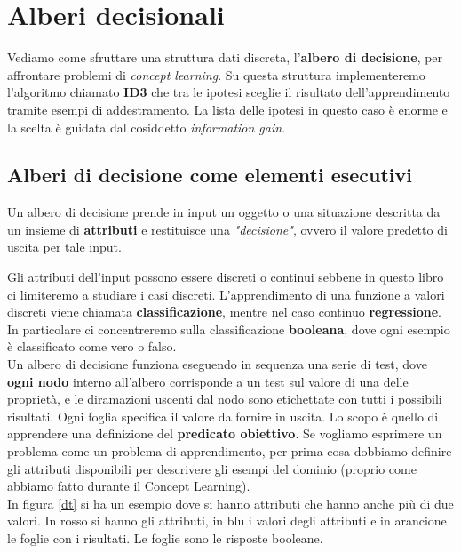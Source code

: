 \chapter{Alberi decisionali}
\label{Capitolo 3}
Vediamo come sfruttare una struttura dati discreta, l'\textbf{albero di
  decisione}, per affrontare problemi di \textit{concept learning}. Su questa
struttura implementeremo l'algoritmo chiamato \textbf{ID3} che tra le ipotesi
sceglie il risultato dell'apprendimento tramite esempi di addestramento. La
lista delle ipotesi in questo caso è enorme e la scelta è guidata dal cosiddetto
\textit{information gain}.
\section{Alberi di decisione come elementi esecutivi}
\begin{definizione}
Un albero di decisione prende in input un oggetto o una situazione descritta da un insieme di \textbf{attributi} e restituisce una \textit{"decisione"}, ovvero il valore predetto di uscita per tale input.
\end{definizione}
Gli attributi dell'input possono essere discreti o continui sebbene in questo libro ci limiteremo a studiare i casi discreti. L'apprendimento di una funzione a valori discreti viene chiamata \textbf{classificazione}, mentre nel caso continuo \textbf{regressione}. In particolare ci concentreremo sulla classificazione \textbf{booleana}, dove ogni esempio è classificato come vero o falso.\\  Un albero di decisione funziona eseguendo in sequenza una serie di test, dove \textbf{ogni nodo} interno all'albero corrisponde a un test sul valore di una delle proprietà, e le diramazioni uscenti dal nodo sono etichettate con tutti i possibili risultati. Ogni foglia specifica il valore da fornire in uscita. Lo scopo è quello di apprendere una definizione del \textbf{predicato obiettivo}. Se vogliamo esprimere un problema come un problema di apprendimento, per prima cosa dobbiamo definire gli attributi disponibili per descrivere gli esempi del dominio (proprio come abbiamo fatto durante il Concept Learning).\\
In figura \ref{dt} si ha un esempio dove si hanno attributi che hanno anche più di due valori. In rosso si hanno gli
attributi, in blu i valori degli attributi e in arancione le foglie con i
risultati. Le foglie sono le risposte booleane.
